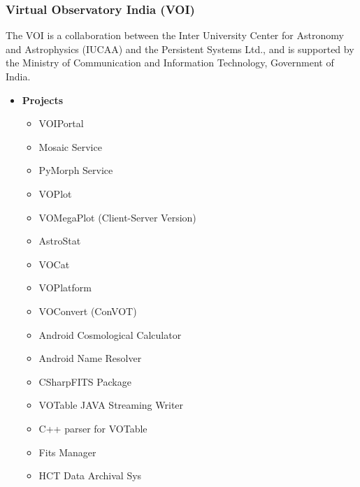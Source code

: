 \subsubsection{Virtual Observatory India (VOI)}
The VOI is a collaboration between the Inter University Center for Astronomy
and Astrophysics (IUCAA) and the Persistent Systems Ltd., and is supported by
the Ministry of Communication and Information Technology, Government of India.

\begin{itemize}
	\item \textbf{Projects}
	\begin{itemize}
		\item VOIPortal
		\item Mosaic Service
		\item PyMorph Service
		\item VOPlot
		\item VOMegaPlot (Client-Server Version)
		\item AstroStat
		\item VOCat
		\item VOPlatform
		\item VOConvert (ConVOT)
		\item Android Cosmological Calculator
		\item Android Name Resolver
		\item CSharpFITS Package
		\item VOTable JAVA Streaming Writer
		\item C++ parser for VOTable
		\item Fits Manager
		\item HCT Data Archival Sys
	\end{itemize}
\end{itemize}
